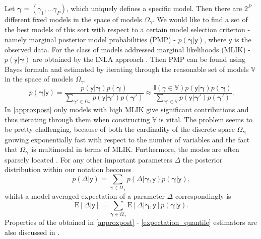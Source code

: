 \documentclass[a0,portrait]{a0poster}
\begin{document}
\begin{multicols}{2}
Let $\boldsymbol{\gamma} = (\gamma_1,...\gamma_P)$, which uniquely defines a specific model. Then there are $2^{P}$ different fixed  models in the space of models $\Omega_{\gamma}$. We would like to find a set of the best models of this sort with respect to a certain model selection criterion - namely marginal posterior model probabilities (PMP) - $p(\boldsymbol{\gamma}|\boldsymbol{\mathsf{y}})$,  where $\boldsymbol{\mathsf{y}}$ is the observed data. For the class of models addressed marginal likelihoods (MLIK) - $p(\boldsymbol{\mathsf{y}}|\boldsymbol{\gamma})$ are obtained by the INLA approach \cite{rue2009eINLA}. Then PMP can be found using Bayes formula and estimated by iterating through the reasonable set of models  $\mathbb{V}$  in the space of models $\Omega_{\gamma}$.
\begin{equation}\label{approxpost}
p(\boldsymbol{\gamma}|\boldsymbol{\mathsf{y}}) =  \frac{{p(\boldsymbol{\mathsf{y}}|\boldsymbol{\gamma})p(\boldsymbol{\gamma})}}{\sum_{\boldsymbol{\boldsymbol{\gamma}}' \in\Omega_{\boldsymbol{\gamma}}}{p(\boldsymbol{\mathsf{y}}| \boldsymbol{\gamma}')p(\boldsymbol{\gamma}')}}\approx\frac{{\mathbb{I}(\gamma \in \mathbb{V})p(\boldsymbol{\mathsf{y}}|\boldsymbol{\gamma})p(\boldsymbol{\gamma})}}{\sum_{\boldsymbol{\boldsymbol{\gamma}}' \in \mathbb{V}}{p(\boldsymbol{\mathsf{y}}| \boldsymbol{\gamma}')p(\boldsymbol{\gamma}')}}.
\end{equation}
In \eqref{approxpost} only models with high MLIK give significant contributions and thus iterating through them when constructing $\mathbb{V}$ is vital. The problem seems to be pretty challenging, because of both the cardinality of the discrete space $\Omega_{\boldsymbol{\gamma}}$ growing exponentially fast with respect to the number of variables and the fact that $\Omega_{\boldsymbol{\gamma}}$  is multimodal in terms of MLIK. Furthermore, the modes are often sparsely located \cite{Hubin2016}. 
For any other important parameters $\Delta$ the posterior distribution within our notation becomes 
\begin{equation}\label{posterior_quantile}
p(\Delta|\boldsymbol{\mathsf{y}}) =  \sum_{\boldsymbol{\boldsymbol{\gamma}} \in\Omega_{\boldsymbol{\gamma}}}{p(\Delta|\boldsymbol{\gamma},\boldsymbol{\mathsf{y}})p(\boldsymbol{\gamma}|\boldsymbol{\mathsf{y}})},
\end{equation}
whilst a model averaged expectation of a parameter $\Delta$ correspondingly is
\begin{equation}\label{expectation_quantile}
\text{E}[\Delta|\boldsymbol{\mathsf{y}}] =  \sum_{\boldsymbol{\boldsymbol{\gamma}} \in\Omega_{\boldsymbol{\gamma}}}{\text{E}[\Delta|\boldsymbol{\gamma},\boldsymbol{\mathsf{y}}]p(\boldsymbol{\gamma}|\boldsymbol{\mathsf{y}})}.
\end{equation}
Properties of the obtained in \eqref{approxpost} - \eqref{expectation_quantile} estimators are also discussed in \cite{Hubin2016}.


\end{multicols}
\end{document}
